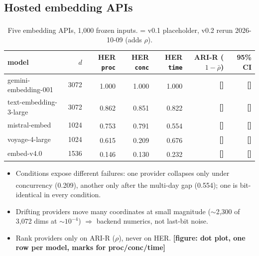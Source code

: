 \documentclass{article}
\newcommand{\pend}[1]{\textcolor{inkMuted}{#1}\textsuperscript{\textcolor{inkMuted}{\dag}}}
\newcommand{\todo}[1]{\textcolor{sTwo}{\textbf{[#1]}}}
\begin{document}
\subsection{Hosted embedding APIs}
\begin{table}[h]\centering\footnotesize
\caption{Five embedding APIs, 1{,}000 frozen inputs. \pend{} = v0.1 placeholder, v0.2 rerun 2026-10-09 (adds $\rho$).}\label{tab:api}
\begin{tabular}{lrrrrrr}
\toprule
model & $d$ & HER \texttt{proc} & HER \texttt{conc} & HER \texttt{time} & ARI-R ($1-\bar\rho$) & 95\% CI \\
\midrule
gemini-embedding-001 & 3072 & \pend{1.000} & \pend{1.000} & \pend{1.000} & \todo{} & \todo{} \\
text-embedding-3-large & 3072 & \pend{0.862} & \pend{0.851} & \pend{0.822} & \todo{} & \todo{} \\
mistral-embed & 1024 & \pend{0.753} & \pend{0.791} & \pend{0.554} & \todo{} & \todo{} \\
voyage-4-large & 1024 & \pend{0.615} & \pend{0.209} & \pend{0.676} & \todo{} & \todo{} \\
embed-v4.0 & 1536 & \pend{0.146} & \pend{0.130} & \pend{0.232} & \todo{} & \todo{} \\
\bottomrule
\end{tabular}
\end{table}
\begin{itemize}
  \item Conditions expose different failures: one provider collapses only under concurrency (\pend{0.209}), another only after the multi-day gap (\pend{0.554}); one is bit-identical in every condition.
  \item Drifting providers move many coordinates at small magnitude ($\sim$2{,}300 of 3{,}072 dims at $\sim10^{-4}$) $\Rightarrow$ backend numerics, not last-bit noise.
  \item Rank providers only on ARI-R ($\rho$), never on HER. \todo{figure: dot plot, one row per model, marks for proc/conc/time}
\end{itemize}
\end{document}
